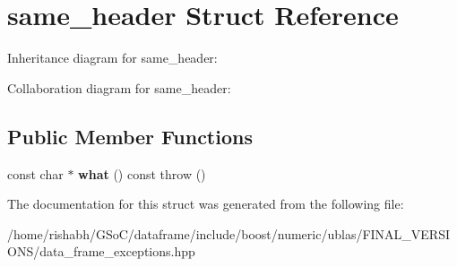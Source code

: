 \hypertarget{structsame__header}{}\section{same\+\_\+header Struct Reference}
\label{structsame__header}


Inheritance diagram for same\+\_\+header\+:


Collaboration diagram for same\+\_\+header\+:
\subsection*{Public Member Functions}
\begin{DoxyCompactItemize}
\item 
const char $\ast$ {\bfseries what} () const   throw ()\hypertarget{structsame__header_a4609a416bc1d341ea341a54473207d89}{}\label{structsame__header_a4609a416bc1d341ea341a54473207d89}

\end{DoxyCompactItemize}


The documentation for this struct was generated from the following file\+:\begin{DoxyCompactItemize}
\item 
/home/rishabh/\+G\+So\+C/dataframe/include/boost/numeric/ublas/\+F\+I\+N\+A\+L\+\_\+\+V\+E\+R\+S\+I\+O\+N\+S/data\+\_\+frame\+\_\+exceptions.\+hpp\end{DoxyCompactItemize}
